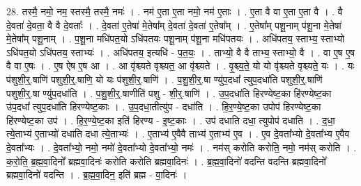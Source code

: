 \documentclass[17pt]{extarticle}
\begin{document}
28. तस्मै॒ नमो॒ नम॒ स्तस्मै॒ तस्मै॒ नमः॑ । . नम॑ ए॒ता ए॒ता नमो॒ नम॑ ए॒ताः । . ए॒ता वै वा ए॒ता ए॒ता वै । . वै दे॒वता॑ दे॒वता॒ वै वै दे॒वताः᳚ । . दे॒वता॑ ए॒तेषा॑ मे॒तेषा᳚म् दे॒वता॑ दे॒वता॑ ए॒तेषा᳚म् । . ए॒तेषा᳚म् पशू॒नाम् प॑शू॒ना मे॒तेषा॑ मे॒तेषा᳚म् पशू॒नाम् । . प॒शू॒ना मधि॑पत॒यो ऽधि॑पतयः पशू॒नाम् प॑शू॒ना मधि॑पतयः । . अधि॑पतय॒ स्ताभ्य॒ स्ताभ्यो ऽधि॑पत॒यो ऽधि॑पतय॒ स्ताभ्यः॑ । . अधि॑पतय॒ इत्यधि॑ - प॒त॒यः॒ । . ताभ्यो॒ वै वै ताभ्य॒ स्ताभ्यो॒ वै । . वा ए॒ष ए॒ष वै वा ए॒षः । . ए॒ष ऐष ए॒ष आ । . आ वृ॑श्च्यते वृश्च्यत॒ आ वृ॑श्च्यते । . वृ॒श्च्य॒ते॒ यो यो वृ॑श्च्यते वृश्च्यते॒ यः । . यः प॑शुशी॒र्॒.षाणि॑ पशुशी॒र्॒.षाणि॒ यो यः प॑शुशी॒र्॒.षाणि॑ । . प॒शु॒शी॒र्॒.षा ण्यु॑प॒दधा᳚ त्युप॒दधा॑ति पशुशी॒र्॒.षाणि॑ पशुशी॒र्॒.षा ण्यु॑प॒दधा॑ति । . प॒शु॒शी॒र्॒.षाणीति॑ पशु - शी॒र्॒.षाणि॑ । . उ॒प॒दधा॑ति हिरण्येष्ट॒का हि॑रण्येष्ट॒का उ॑प॒दधा᳚ त्युप॒दधा॑ति हिरण्येष्ट॒काः । . उ॒प॒दधा॒तीत्यु॑प - दधा॑ति । . हि॒र॒ण्ये॒ष्ट॒का उपोप॑ हिरण्येष्ट॒का हि॑रण्येष्ट॒का उप॑ । . हि॒र॒ण्ये॒ष्ट॒का इति॑ हिरण्य - इ॒ष्ट॒काः । . उप॑ दधाति दधा॒ त्युपोप॑ दधाति । . द॒धा॒ त्ये॒ताभ्य॑ ए॒ताभ्यो॑ दधाति दधा त्ये॒ताभ्यः॑ । . ए॒ताभ्य॑ ए॒वैवै ताभ्य॑ ए॒ताभ्य॑ ए॒व । . ए॒व दे॒वता᳚भ्यो दे॒वता᳚भ्य ए॒वैव दे॒वता᳚भ्यः । . दे॒वता᳚भ्यो॒ नमो॒ नमो॑ दे॒वता᳚भ्यो दे॒वता᳚भ्यो॒ नमः॑ । . नम॑स् करोति करोति॒ नमो॒ नम॑स् करोति । . क॒रो॒ति॒ ब्र॒ह्म॒वा॒दिनो᳚ ब्रह्मवा॒दिनः॑ करोति करोति ब्रह्मवा॒दिनः॑ । . ब्र॒ह्म॒वा॒दिनो॑ वदन्ति वदन्ति ब्रह्मवा॒दिनो᳚ ब्रह्मवा॒दिनो॑ वदन्ति । . ब्र॒ह्म॒वा॒दिन॒ इति॑ ब्रह्म - वा॒दिनः॑ । \newline
\end{document}
